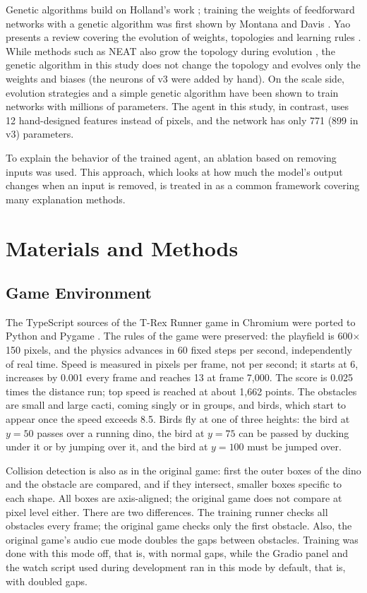 \documentclass[11pt,a4paper]{article}
\begin{document}
Genetic algorithms build on Holland's work \cite{holland1975}; training the weights of feedforward networks with a genetic algorithm was first shown by Montana and Davis \cite{montana1989}. Yao presents a review covering the evolution of weights, topologies and learning rules \cite{yao1999}. While methods such as NEAT also grow the topology during evolution \cite{stanley2002}, the genetic algorithm in this study does not change the topology and evolves only the weights and biases (the neurons of v3 were added by hand). On the scale side, evolution strategies \cite{salimans2017} and a simple genetic algorithm \cite{such2017} have been shown to train networks with millions of parameters. The agent in this study, in contrast, uses 12 hand-designed features instead of pixels, and the network has only 771 (899 in v3) parameters.

To explain the behavior of the trained agent, an ablation based on removing inputs was used. This approach, which looks at how much the model's output changes when an input is removed, is treated in \cite{covert2021} as a common framework covering many explanation methods.

\section{Materials and Methods}

\subsection{Game Environment}

The TypeScript sources of the T-Rex Runner game in Chromium \cite{chromium} were ported to Python and Pygame \cite{pygame}. The rules of the game were preserved: the playfield is 600$\times$150 pixels, and the physics advances in 60 fixed steps per second, independently of real time. Speed is measured in pixels per frame, not per second; it starts at 6, increases by 0.001 every frame and reaches 13 at frame 7,000. The score is 0.025 times the distance run; top speed is reached at about 1,662 points. The obstacles are small and large cacti, coming singly or in groups, and birds, which start to appear once the speed exceeds 8.5. Birds fly at one of three heights: the bird at ${y = 50}$ passes over a running dino, the bird at ${y = 75}$ can be passed by ducking under it or by jumping over it, and the bird at ${y = 100}$ must be jumped over.

Collision detection is also as in the original game: first the outer boxes of the dino and the obstacle are compared, and if they intersect, smaller boxes specific to each shape. All boxes are axis-aligned; the original game does not compare at pixel level either. There are two differences. The training runner checks all obstacles every frame; the original game checks only the first obstacle. Also, the original game's audio cue mode doubles the gaps between obstacles. Training was done with this mode off, that is, with normal gaps, while the Gradio panel and the watch script used during development ran in this mode by default, that is, with doubled gaps.
\end{document}
